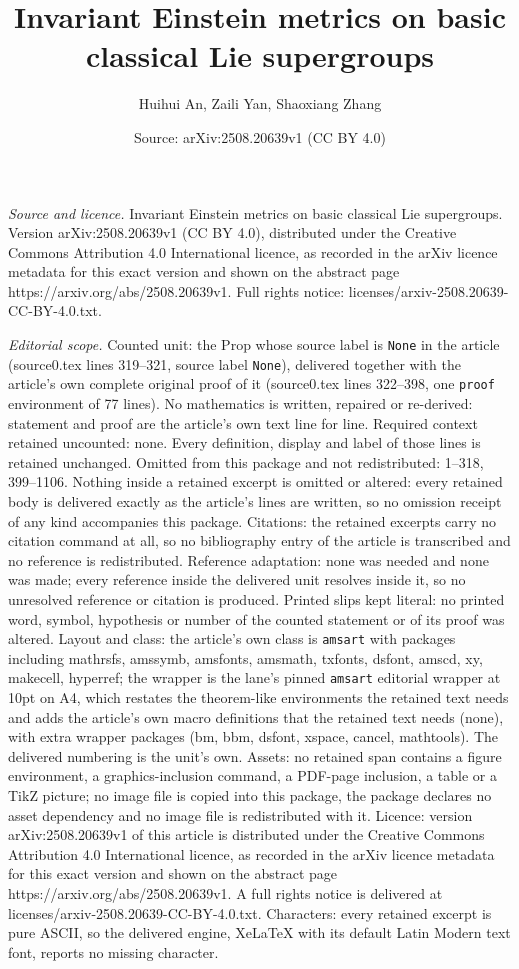 \documentclass[10pt,a4paper]{amsart}
\title[Invariant Einstein metrics on basic classical Lie supergroup]{Invariant Einstein metrics on basic classical Lie supergroups}
\author{Huihui An, Zaili Yan, Shaoxiang Zhang}
\date{Source: arXiv:2508.20639v1 (CC BY 4.0)}
\begin{document}
\maketitle

\noindent\emph{Source and licence.} Invariant Einstein metrics on basic classical Lie supergroups. Version arXiv:2508.20639v1 (CC BY 4.0), distributed under the Creative Commons Attribution 4.0 International licence, as recorded in the arXiv licence metadata for this exact version and shown on the abstract page https://arxiv.org/abs/2508.20639v1. Full rights notice: licenses/arxiv-2508.20639-CC-BY-4.0.txt.\par\smallskip

\noindent\textit{Editorial scope.} Counted unit: the Prop whose source label is \texttt{None} in the article (source0.tex lines 319--321, source label \texttt{None}), delivered together with the article's own complete original proof of it (source0.tex lines 322--398, one \texttt{proof} environment of 77 lines). No mathematics is written, repaired or re-derived: statement and proof are the article's own text line for line. Required context retained uncounted: none. Every definition, display and label of those lines is retained unchanged. Omitted from this package and not redistributed: 1--318, 399--1106. Nothing inside a retained excerpt is omitted or altered: every retained body is delivered exactly as the article's lines are written, so no omission receipt of any kind accompanies this package. Citations: the retained excerpts carry no citation command at all, so no bibliography entry of the article is transcribed and no reference is redistributed. Reference adaptation: none was needed and none was made; every reference inside the delivered unit resolves inside it, so no unresolved reference or citation is produced. Printed slips kept literal: no printed word, symbol, hypothesis or number of the counted statement or of its proof was altered. Layout and class: the article's own class is \texttt{amsart} with packages including mathrsfs, amssymb, amsfonts, amsmath, txfonts, dsfont, amscd, xy, makecell, hyperref; the wrapper is the lane's pinned \texttt{amsart} editorial wrapper at 10pt on A4, which restates the theorem-like environments the retained text needs and adds the article's own macro definitions that the retained text needs (none), with extra wrapper packages (bm, bbm, dsfont, xspace, cancel, mathtools). The delivered numbering is the unit's own. Assets: no retained span contains a figure environment, a graphics-inclusion command, a PDF-page inclusion, a table or a TikZ picture; no image file is copied into this package, the package declares no asset dependency and no image file is redistributed with it. Licence: version arXiv:2508.20639v1 of this article is distributed under the Creative Commons Attribution 4.0 International licence, as recorded in the arXiv licence metadata for this exact version and shown on the abstract page https://arxiv.org/abs/2508.20639v1. A full rights notice is delivered at licenses/arxiv-2508.20639-CC-BY-4.0.txt. Characters: every retained excerpt is pure ASCII, so the delivered engine, XeLaTeX with its default Latin Modern text font, reports no missing character.
\end{document}
